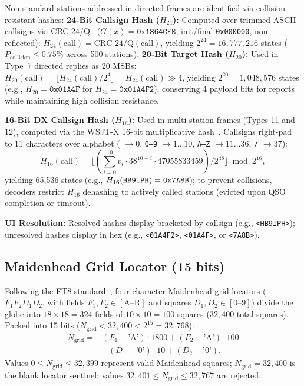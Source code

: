 {Non-standard stations addressed in directed frames are identified via collision-resistant hashes:
\textbf{24-Bit Callsign Hash ($H_{24}$):} Computed over trimmed ASCII callsigns via CRC-24/Q~\cite{crc24q} ($G(x) = \texttt{0x1864CFB}$, init/final \texttt{0x000000}, non-reflected): $H_{24}(\text{call}) = \text{CRC-24/Q}(\text{call})$, yielding $2^{24} = 16{,}777{,}216$ states ($P_{\text{collision}} \le 0.75\%$ across 500 stations).
\textbf{20-Bit Target Hash ($H_{20}$):} Used in Type~7 directed replies as 20 MSBs: $H_{20}(\text{call}) = \lfloor H_{24}(\text{call}) / 2^4 \rfloor = H_{24}(\text{call}) \gg 4$, yielding $2^{20} = 1{,}048{,}576$ states (e.g., $H_{20} = \texttt{0x01A4F}$ for $H_{24} = \texttt{0x01A4F2}$), conserving 4 payload bits for reports while maintaining high collision resistance.

\textbf{16-Bit DX Callsign Hash ($H_{16}$):} Used in multi-station frames (Types 11 and 12), computed via the WSJT-X 16-bit multiplicative hash~\cite{wsjtx}. Callsigns right-pad to 11 characters over alphabet (\textvisiblespace{} $\to 0$, \texttt{0--9} $\to 1\dots 10$, \texttt{A--Z} $\to 11\dots 36$, \texttt{/} $\to 37$):
\begin{equation}
  H_{16}(\text{call}) = \lfloor (\textstyle\sum_{i=0}^{10} v_i \cdot 38^{10-i} \cdot 47055833459) / 2^{48} \rfloor \bmod 2^{16},
\end{equation}
yielding 65,536 states (e.g., $H_{16}(\text{\texttt{HB9IPH}}) = \texttt{0x7A8B}$); to prevent collisions, decoders restrict $H_{16}$ dehashing to actively called stations (evicted upon QSO completion or timeout).

\textbf{UI Resolution:} Resolved hashes display bracketed by callsign (e.g., \texttt{<HB9IPH>}); unresolved hashes display in hex (e.g., \texttt{<01A4F2>}, \texttt{<01A4F>}, or \texttt{<7A8B>}).

\subsection{Maidenhead Grid Locator (15 bits)}
\label{sec:locator}

Following the FT8 standard~\cite{ft8,wsjtx,maidenhead}, four-character Maidenhead grid locators ($F_1 F_2 D_1 D_2$, with fields $F_1, F_2 \in [\text{A--R}]$ and squares $D_1, D_2 \in [0\text{--}9]$) divide the globe into $18 \times 18 = 324$ fields of $10 \times 10 = 100$ squares ($32{,}400$ total squares). Packed into 15 bits ($N_{\text{grid}} < 32{,}400 < 2^{15} = 32{,}768$):
\begin{equation}
\begin{aligned}
  N_{\text{grid}} ={}& (F_1 - \text{'A'}) \cdot 1800 + (F_2 - \text{'A'}) \cdot 100 \\
                     & + (D_1 - \text{'0'}) \cdot 10 + (D_2 - \text{'0'}).
\end{aligned}
\label{eq:grid}
\end{equation}
Values $0 \le N_{\text{grid}} \le 32{,}399$ represent valid Maidenhead squares; $N_{\text{grid}} = 32{,}400$ is the blank locator sentinel; values $32{,}401 \le N_{\text{grid}} \le 32{,}767$ are rejected.

}
